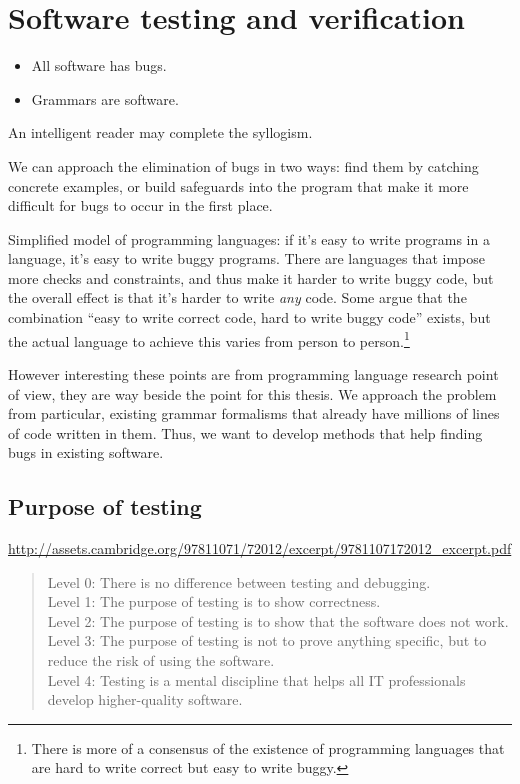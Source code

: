 \section{Software testing and verification}
\label{sec:testing-intro} 


\begin{itemize}
\item All software has bugs.
\item Grammars are software.
\end{itemize}

An intelligent reader may complete the syllogism.

We can approach the elimination of bugs in two ways: find them by
catching concrete examples, or build safeguards into the program that
make it more difficult for bugs to occur in the first place.

Simplified model of programming languages: if it's easy to write
programs in a language, it's easy to write buggy programs. There are
languages that impose more checks and constraints, and thus make it
harder to write buggy code, but the overall effect is that it's harder
to write \emph{any} code. Some argue that the combination ``easy to
write correct code, hard to write buggy code'' exists, but the actual
language to achieve this varies from person to person.\footnote{There
  is more of a consensus of the existence of programming languages
  that are hard to write correct but easy to write buggy.} 

However interesting these points are from programming language
research point of view, they are way beside the point for this
thesis. We approach the problem from particular, existing grammar
formalisms that already have millions of lines of code written in
them. Thus, we want to develop methods that help finding bugs in
existing software. 

\subsection{Purpose of testing}

\url{http://assets.cambridge.org/97811071/72012/excerpt/9781107172012_excerpt.pdf}

\begin{quote}
Level 0:  There is no difference between testing and debugging. \\
Level 1: The purpose of testing is to show correctness. \\
Level 2: The purpose of testing is to show that the software does not work. \\
Level 3: The purpose of testing is not to prove anything specific, but to reduce the risk of using the software. \\
Level 4: Testing is a mental discipline that helps all IT professionals develop higher-quality software. \\
\end{quote}

